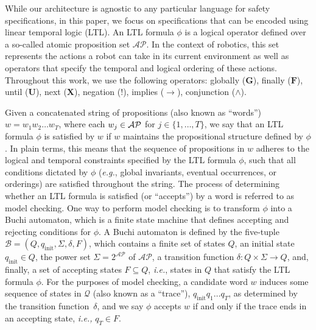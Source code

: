 While our architecture is agnostic to any particular language for safety specifications, in this paper, we focus on specifications that can be encoded using linear temporal logic (LTL). An LTL formula $\phi$ is a logical operator defined over a so-called atomic proposition set $\mathcal{AP}$.  In the context of robotics, this set represents the actions a robot can take in its current environment as well as operators that specify the temporal and logical ordering of these actions.  Throughout this work, we use the following operators: globally ($\mathbf{G}$), finally ($\mathbf{F}$), until ($\mathbf{U}$), next ($\mathbf{X}$), negation ($!$), implies ($\rightarrow$), conjunction ($\wedge$). 

Given a concatenated string of propositions (also known as ``words'') $w = w_1 w_2 \dots w_T$, where each $w_j\in\cal{AP}$ for $j\in\{1, \dots, T\}$, we say that an LTL formula $\phi$ is satisfied by $w$ if $w$ maintains the propositional structure defined by $\phi$. In plain terms, this means that the sequence of propositions in 
$w$ adheres to the logical and temporal constraints specified by the LTL formula $\phi$, such that all conditions dictated by $\phi$ (\textit{e.g.}, global invariants, eventual occurrences, or orderings) are satisfied throughout the string.  The process of determining whether an LTL formula is satisfied (or ``accepts'') by a word is referred to as model checking.  
One way to perform model checking is to transform $\phi$ into a Buchi automaton, which is a finite state machine that defines accepting and rejecting conditions for $\phi$. A Buchi automaton is defined by the five-tuple $\mathcal{B} = (Q, q_{\text{init}}, \Sigma, \delta, F)$, which contains a finite set of states $Q$, an initial state $q_{\text{init}}\in Q$, the power set $\Sigma = 2^{\mathcal{AP}}$ of $\mathcal{AP}$, a transition function $\delta:Q\times\Sigma\to Q$, and, finally, a set of accepting states $F\subseteq Q$, \textit{i.e.}, states in $Q$ that satisfy the LTL formula $\phi$.  
For the purposes of model checking, a candidate word $w$ induces some sequence of states in $\mathcal{Q}$ (also known as a ``trace''), $q_{\text{init}}q_1 \dots q_T$, as determined by the transition function~$\delta$, and we say $\phi$ accepts $w$ if and only if the trace ends in an accepting state, \textit{i.e.,} $q_T \in F$.

